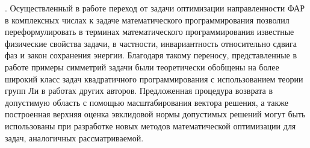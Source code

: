 {\theorInfluence}.
Осуществленный в работе переход от задачи оптимизации направленности ФАР в комплексных числах к задаче математического программирования позволил переформулировать в терминах математического программирования известные физические свойства задачи, в частности, инвариантность относительно сдвига фаз и закон сохранения энергии. Благодаря такому переносу, представленные в работе примеры симметрий задачи были теоретически обобщены на более широкий класс задач квадратичного программирования с использованием теории групп Ли в работах других авторов. Предложенная процедура возврата в допустимую область с помощью масштабирования вектора решения, а также построенная верхняя оценка эвклидовой нормы допустимых решений могут быть использованы при разработке новых методов математической оптимизации для задач, аналогичных рассматриваемой.

